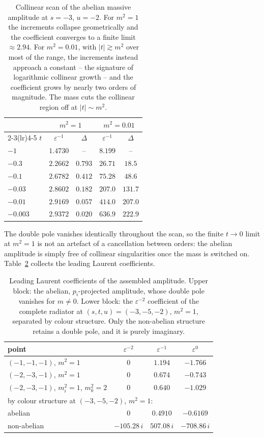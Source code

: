 \documentclass[11pt,a4paper]{article}
\newcommand{\eps}{\varepsilon}
\begin{document}
\begin{table}[t]
\centering
\caption{Collinear scan of the abelian massive amplitude at $s=-3$, $u=-2$. For
$m^2=1$ the increments collapse geometrically and the coefficient converges to a
finite limit $\approx2.94$. For $m^2=0.01$, with $|t|\gtrsim m^2$ over most of
the range, the increments instead approach a constant  --  the signature of
logarithmic collinear growth  --  and the coefficient grows by nearly two orders
of magnitude. The mass cuts the collinear region off at $|t|\sim m^2$.}
\label{tab:collinear}
\begin{tabular}{lcccc}
\toprule
 & \multicolumn{2}{c}{$m^2=1$} & \multicolumn{2}{c}{$m^2=0.01$}\\
\cmidrule(lr){2-3}\cmidrule(lr){4-5}
$t$ & $\eps^{-1}$ & $\Delta$ & $\eps^{-1}$ & $\Delta$\\
\midrule
$-1$      & $1.4730$ &  --      & $8.199$ &  -- \\
$-0.3$    & $2.2662$ & $0.793$ & $26.71$ & $18.5$\\
$-0.1$    & $2.6782$ & $0.412$ & $75.28$ & $48.6$\\
$-0.03$   & $2.8602$ & $0.182$ & $207.0$ & $131.7$\\
$-0.01$   & $2.9169$ & $0.057$ & $414.0$ & $207.0$\\
$-0.003$  & $2.9372$ & $0.020$ & $636.9$ & $222.9$\\
\bottomrule
\end{tabular}
\end{table}

The double pole vanishes identically throughout the scan, so the finite $t\to0$
limit at $m^2=1$ is not an artefact of a cancellation between orders: the abelian
amplitude is simply free of collinear singularities once the mass is switched on.
Table~\ref{tab:poles} collects the leading Laurent coefficients.

\begin{table}[t]
\centering
\caption{Leading Laurent coefficients of the assembled amplitude. Upper block:
the abelian, $p_i$-projected amplitude, whose double pole vanishes for $m\neq0$.
Lower block: the $\eps^{-2}$ coefficient of the complete radiator at
$(s,t,u)=(-3,-5,-2)$, $m^2=1$, separated by colour structure. Only the
non-abelian structure retains a double pole, and it is purely imaginary.}
\label{tab:poles}
\begin{tabular}{lccc}
\toprule
point & $\eps^{-2}$ & $\eps^{-1}$ & $\eps^{0}$\\
\midrule
$(-1,-1,-1)$, $m^2=1$              & $0$ & $1.194$ & $-1.766$\\
$(-2,-3,-1)$, $m^2=1$              & $0$ & $0.674$ & $-0.743$\\
$(-2,-3,-1)$, $m_i^2=1$, $m_k^2=2$ & $0$ & $0.640$ & $-1.029$\\
\midrule
\multicolumn{4}{l}{by colour structure at $(-3,-5,-2)$, $m^2=1$:}\\
\quad abelian     & $0$          & $0.4910$    & $-0.6169$\\
\quad non-abelian & $-105.28\,i$ & $507.08\,i$ & $-708.86\,i$\\
\bottomrule
\end{tabular}
\end{table}
\end{document}
